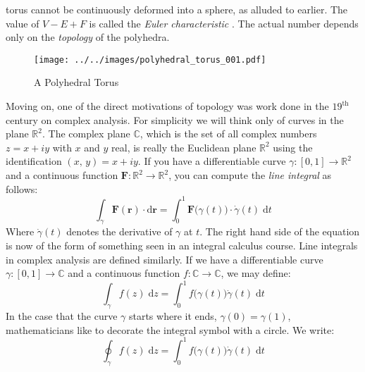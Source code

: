     torus cannot be continuously deformed into a sphere, as alluded to earlier.
    The value of $V-E+F$ is called the \textit{Euler characteristic}%
    . The
    actual number depends only on the \textit{topology} of the polyhedra.
    \begin{figure}
        \centering
        \texttt{[image: ../../images/polyhedral\_torus\_001.pdf]}
        \caption{A Polyhedral Torus}
        \label{fig:polyhedral_torus_001}
    \end{figure}
    \par\hfill\par
    Moving on, one of the direct motivations of topology was work done in the
    $19^{\textrm{th}}$ century on complex analysis. For simplicity we will
    think only of curves in the plane $\mathbb{R}^{2}$. The complex plane
    $\mathbb{C}$, which is the set of all complex numbers $z=x+iy$ with
    $x$ and $y$ real, is really the Euclidean plane $\mathbb{R}^{2}$
    using the identification $(x,\,y)=x+iy$. If you have a
    differentiable curve $\gamma:[0,1]\rightarrow\mathbb{R}^{2}$ and a
    continuous function
    $\mathbf{F}:\mathbb{R}^{2}\rightarrow\mathbb{R}^{2}$, you can compute the
    \textit{line integral} as follows:
    \begin{equation}
        \int_{\gamma}\mathbf{F}(\mathbf{r})\cdot\textrm{d}\mathbf{r}
            =\int_{0}^{1}\mathbf{F}\big(\gamma(t)\big)\cdot
                \dot{\gamma}(t)\;\textrm{d}t
    \end{equation}
    Where $\dot{\gamma}(t)$ denotes the derivative of $\gamma$ at $t$.
    The right hand side of the equation is now of the form of something seen
    in an integral calculus course. Line integrals in complex analysis are
    defined similarly. If we have a differentiable curve
    $\gamma:[0,1]\rightarrow\mathbb{C}$ and a continuous function
    $f:\mathbb{C}\rightarrow\mathbb{C}$, we may define:
    \begin{equation}
        \int_{\gamma}f(z)\;\textrm{d}z
            =\int_{0}^{1}f\big(\gamma(t)\big)\dot{\gamma}(t)\;\textrm{d}t
    \end{equation}
    In the case that the curve $\gamma$ starts where it ends,
    $\gamma(0)=\gamma(1)$, mathematicians like to decorate the integral symbol
    with a circle. We write:
    \begin{equation}
        \oint_{\gamma}f(z)\;\textrm{d}z=
            \int_{0}^{1}f\big(\gamma(t)\big)\dot{\gamma}(t)\;\textrm{d}t
    \end{equation}
